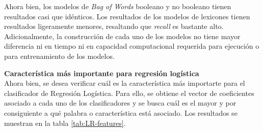 Ahora bien, los modelos de \textit{Bag of Words} booleano y no booleano tienen resultados casi que idénticos. Los resultados de los modelos de lexicones tienen resultados ligeramente menores, resaltando que \textit{recall} es bastante alto. Adicionalmente, la construcción de cada uno de los modelos no tiene mayor diferencia ni en tiempo ni en capacidad computacional requerida para ejecución o para entrenamiento de los modelos.

\textbf{Característica más importante para regresión logística}\\
Ahora bien, se desea verificar cuál es la característica más importarte para el clasificador de Regresión Logística. Para ello, se obtiene el vector de coeficientes asociado a cada uno de los clasificadores y se busca cuál es el mayor y por consiguiente a qué palabra o característica está asociado. Los resultados se muestran en la tabla \ref{tab:LR-features}.

